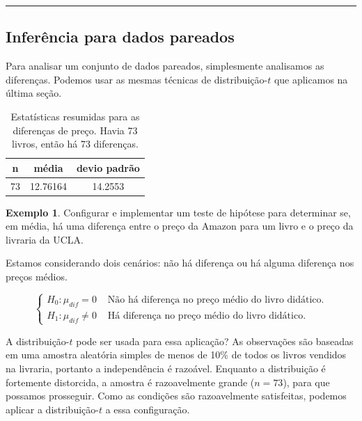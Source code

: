 \documentclass[
]{book}
\theoremstyle{definition}
\theoremstyle{definition}
\newtheorem{example}{Exemplo}[chapter]
\theoremstyle{definition}
\theoremstyle{definition}
\theoremstyle{remark}
\begin{document}
\begin{center}\rule{0.5\linewidth}{0.5pt}\end{center}

\hypertarget{inferencePairedData}{%
\subsection{Inferência para dados pareados}\label{inferencePairedData}}

Para analisar um conjunto de dados pareados, simplesmente analisamos as diferenças. Podemos usar as mesmas técnicas de distribuição-\(t\) que aplicamos na última seção.

\begin{table}

\caption{\label{tab:textbooksSummaryStats}Estatísticas resumidas para as diferenças de preço. Havia 73 livros, então há 73 diferenças.}
\centering
\begin{tabular}[t]{c|c|c}
\hline
n & média & devio padrão\\
\hline
73 & 12.76164 & 14.2553\\
\hline
\end{tabular}
\end{table}

\begin{example}
\protect\hypertarget{exm:htForDiffInUCLAAndAmazonTextbookPrices}{}{\label{exm:htForDiffInUCLAAndAmazonTextbookPrices} }Configurar e implementar um teste de hipótese para determinar se, em média, há uma diferença entre o preço da Amazon para um livro e o preço da livraria da UCLA.
\end{example}

Estamos considerando dois cenários: não há diferença ou há alguma diferença nos preços médios.

\[
\begin{cases}
  H_0: \mu_{dif}=0 & \mbox{ Não há diferença no preço médio do livro didático.} \\
  H_1: \mu_{dif}\neq0 & \mbox{ Há diferença no preço médio do livro didático.}
\end{cases}
\]

A distribuição-\(t\) pode ser usada para essa aplicação? As observações são baseadas em uma amostra aleatória simples de menos de 10\% de todos os livros vendidos na livraria, portanto a independência é razoável. Enquanto a distribuição é fortemente distorcida, a amostra é razoavelmente grande (\(n = 73\)), para que possamos prosseguir. Como as condições são razoavelmente satisfeitas, podemos aplicar a distribuição-\(t\) a essa configuração.
\end{document}
